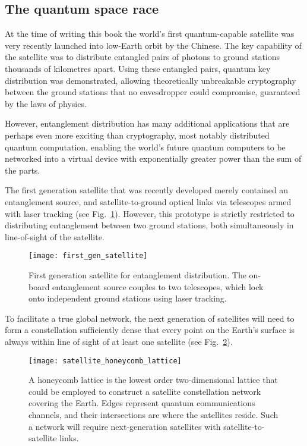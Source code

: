 %
%

\subsection{The quantum space race}\label{sec:quant_space_race_essay}

At the time of writing this book the world's first quantum-capable satellite was very recently launched into low-Earth orbit by the Chinese. The key capability of the satellite was to distribute entangled pairs of photons to ground stations thousands of kilometres apart. Using these entangled pairs, quantum key distribution was demonstrated, allowing theoretically unbreakable cryptography between the ground stations that no eavesdropper could compromise, guaranteed by the laws of physics.

However, entanglement distribution has many additional applications that are perhaps even more exciting than cryptography, most notably distributed quantum computation, enabling the world's future quantum computers to be networked into a virtual device with exponentially greater power than the sum of the parts.

The first generation satellite that was recently developed merely contained an entanglement source, and satellite-to-ground optical links via telescopes armed with laser tracking (see Fig.~\ref{fig:first_gen_sat}). However, this prototype is strictly restricted to distributing entanglement between two ground stations, both simultaneously in line-of-sight of the satellite.

\begin{figure}[!htb]
\texttt{[image: first\_gen\_satellite]}
\caption{First generation satellite for entanglement distribution. The on-board entanglement source couples to two telescopes, which lock onto independent ground stations using laser tracking.}\label{fig:first_gen_sat}	
\end{figure}

To facilitate a true global network, the next generation of satellites will need to form a constellation sufficiently dense that every point on the Earth's surface is always within line of sight of at least one satellite (see Fig.~\ref{fig:sat_honeycomb}).

\begin{figure}[!htb]
\texttt{[image: satellite\_honeycomb\_lattice]}
\caption{A honeycomb lattice is the lowest order two-dimensional lattice that could be employed to construct a satellite constellation network covering the Earth. Edges represent quantum communications channels, and their intersections are where the satellites reside. Such a network will require next-generation satellites with satellite-to-satellite links.}\label{fig:sat_honeycomb}	
\end{figure}

